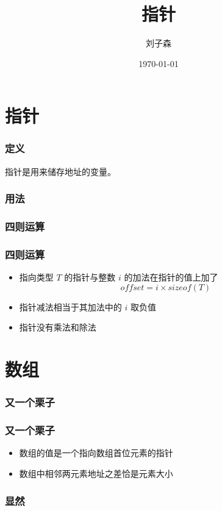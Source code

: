 \documentclass{beamer}
\author{刘子森}
\title{指针}
\date{\today}
\institute{四川大学软件学院}
\begin{document}
\frame{\titlepage}

\begin{frame}
 \tableofcontents
\end{frame}

\section{指针}

\begin{frame}
 \frametitle{定义}
 指针是用来储存地址的变量。
\end{frame}

\begin{frame}
 \frametitle{用法}
 
\end{frame}

\begin{frame}
 \frametitle{四则运算}
 
\end{frame}

\begin{frame}
 \frametitle{四则运算}
 \begin{itemize}
  \item 指向类型 \(T\) 的指针与整数 \(i\) 的加法在指针的值上加了
        \[offset = i \times sizeof(T)\]
  \item 指针减法相当于其加法中的 \(i\) 取负值
  \item 指针没有乘法和除法
 \end{itemize}
\end{frame}

\section{数组}
\begin{frame}
 \frametitle{又一个栗子}
 
\end{frame}

\begin{frame}
 \frametitle{又一个栗子}
 \begin{itemize}
  \item 数组的值是一个指向数组首位元素的指针
  \item 数组中相邻两元素地址之差恰是元素大小
 \end{itemize}
\end{frame}

\begin{frame}

  \frametitle{显然}
  
\end{frame}
\end{document}
